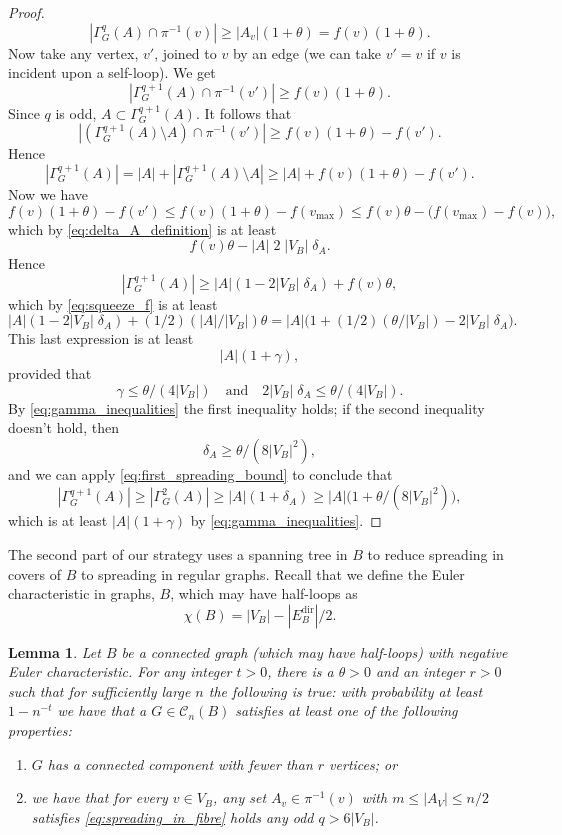 \documentclass{memo-l}
\theoremstyle{plain}
\newtheorem{lemma}[theorem]{Lemma}
\theoremstyle{definition}
\numberwithin{section}{chapter}
\numberwithin{equation}{chapter}
\newcommand{\Edir}{E^{\mathrm{dir}}}
\theoremstyle{plain}
\theoremstyle{definition}
\newcommand\cC{\mathcal{C}}
\begin{document}
\begin{proof}
\begin{equation}
|\Gamma^q_G(A)\cap \pi^{-1}(v) | \ge |A_v| (1+\theta) = f(v)(1+\theta).
\end{equation}
Now take any vertex, $v'$, joined to $v$ by an edge (we can take $v'=v$
if $v$ is incident upon a self-loop).  We get
$$
|\Gamma^{q+1}_G(A)\cap \pi^{-1}(v') | \ge f(v)(1+\theta).
$$
Since $q$ is odd, $A\subset\Gamma^{q+1}_G(A)$.  It follows that
$$
|(\Gamma^{q+1}_G(A)\setminus A)\cap \pi^{-1}(v') | \ge 
f(v)(1+\theta)-f(v').
$$
Hence
$$
|\Gamma^{q+1}_G(A)| =
|A| + 
|\Gamma^{q+1}_G(A)\setminus A| 
\ge |A| + f(v)(1+\theta) - f(v').
$$
Now we have
\begin{equation}\label{eq:lower_bound_outside_A}
f(v)(1+\theta)-f(v')
\le f(v)(1+\theta) - f(v_{\max})
\le f(v)\theta - \bigl(f(v_{\max})-f(v)\bigr),
\end{equation}
which by \eqref{eq:delta_A_definition} is at least 
$$
f(v)\theta - |A|\;2\;|V_B|\; \delta_A.
$$
Hence
$$
|\Gamma^{q+1}_G(A)| \ge
|A| (1-2|V_B|\;\delta_A) + 
f(v)\theta,
$$ 
which by \eqref{eq:squeeze_f} is at least
\begin{equation}\label{eq:to_be_improved_upon}
|A| (1-2|V_B|\;\delta_A) + 
(1/2)(|A|/|V_B|) \theta
=
|A| \bigl(  1 + (1/2)(\theta/|V_B|) - 2|V_B|\;\delta_A \bigr).
\end{equation}
This last expression is at least
$$
|A| (1 + \gamma),
$$
provided that
$$
\gamma \le \theta/(4|V_B|) \quad\mbox{and}\quad
2|V_B|\;\delta_A \le \theta/(4|V_B|).
$$
By \eqref{eq:gamma_inequalities} the first inequality holds; if the
second inequality doesn't hold, then
$$
\delta_A \ge \theta/(8|V_B|^2),
$$
and we can apply
\eqref{eq:first_spreading_bound}
to conclude that 
$$
|\Gamma^{q+1}_G(A)| \ge
|\Gamma^2_G(A)| \ge |A| (1+ \delta_A)
\ge |A| \bigl(1+ \theta/(8|V_B|^2)\bigr),
$$
which is at least $|A|(1+\gamma)$ by
\eqref{eq:gamma_inequalities}.
\end{proof}


The second part of our strategy uses a spanning tree in $B$ to reduce
spreading in covers of $B$ to spreading in regular graphs.
Recall that we define the Euler characteristic in graphs, $B$,
which may have
half-loops as
$$
\chi(B) = |V_B| - |\Edir_B|/2.
$$

\begin{lemma}\label{le:usually_spreads_in_fibre}
Let $B$ be a connected graph (which may have half-loops)
with negative Euler characteristic.  For any
integer $t>0$, there is a $\theta>0$ and an integer $r>0$ such that
for sufficiently large $n$ the following is true: 
with probability at least $1-n^{-t}$ we have that
a $G\in\cC_n(B)$ satisfies at least one of the following properties:
\begin{enumerate}
\item $G$ has a connected component with fewer than $r$ vertices; or
\item we have that for every $v\in V_B$, any set $A_v\in\pi^{-1}(v)$
with $m\le |A_V|\le n/2$ satisfies \eqref{eq:spreading_in_fibre}
holds any odd $q> 6|V_B|$.
\end{enumerate}
\end{lemma}
\end{document}
